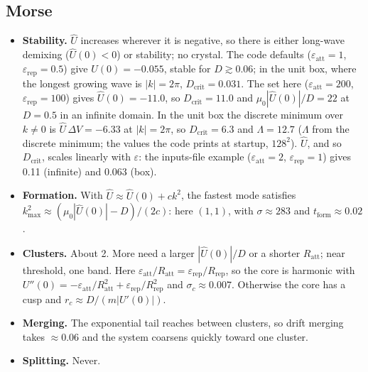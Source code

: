 \documentclass[11pt]{article}
\newcommand{\Uh}{\hat U}
\newcommand{\tf}{t_{\mathrm{form}}}
\begin{document}
\subsection{Morse}
\begin{itemize}
  \item \textbf{Stability.} $\Uh$ increases wherever it is negative, so there
        is either long-wave demixing ($\Uh(0)<0$) or stability; no crystal.
        The code defaults ($\varepsilon_{\mathrm{att}}=1$,
        $\varepsilon_{\mathrm{rep}}=0.5$) give $\Uh(0)=-0.055$, stable for
        $D\gtrsim0.06$; in the unit box, where the longest growing wave is
        $|k|=2\pi$, $D_{\mathrm{crit}}=0.031$. The set here
        ($\varepsilon_{\mathrm{att}}=200$, $\varepsilon_{\mathrm{rep}}=100$)
        gives $\Uh(0)=-11.0$, so $D_{\mathrm{crit}}=11.0$ and $\mu_0|\Uh(0)|/D=22$ at
        $D=0.5$ in an infinite domain. In the unit box the discrete minimum
        over $k\ne0$ is $\Uh\,\Delta V=-6.33$ at $|k|=2\pi$, so
        $D_{\mathrm{crit}}=6.3$ and $\Lambda=12.7$ ($\Lambda$ from the discrete minimum; the values the code prints
        at startup, $128^2$). $\Uh$, and so $D_{\mathrm{crit}}$, scales
        linearly with $\varepsilon$: the inputs-file example
        ($\varepsilon_{\mathrm{att}}=2$, $\varepsilon_{\mathrm{rep}}=1$) gives
        0.11 (infinite) and 0.063 (box).
  \item \textbf{Formation.} With $\Uh\approx\Uh(0)+ck^2$, the fastest mode
        satisfies $k_{\max}^2\approx(\mu_0|\Uh(0)|-D)/(2c)$: here $(1,1)$, with
        $\sigma\approx283$ and $\tf\approx0.02$.
  \item \textbf{Clusters.} About 2. More need a larger $|\Uh(0)|/D$ or a shorter
        $R_{\mathrm{att}}$; near threshold, one band. Here
        $\varepsilon_{\mathrm{att}}/R_{\mathrm{att}}=\varepsilon_{\mathrm{rep}}/R_{\mathrm{rep}}$,
        so the core is harmonic with
        $U''(0)=-\varepsilon_{\mathrm{att}}/R_{\mathrm{att}}^2+\varepsilon_{\mathrm{rep}}/R_{\mathrm{rep}}^2$
        and $\sigma_c\approx0.007$. Otherwise the core has a cusp and
        $r_c\approx D/(m|U'(0)|)$.
  \item \textbf{Merging.} The exponential tail reaches between clusters, so
        drift merging takes $\approx0.06$ and the system coarsens quickly
        toward one cluster.
  \item \textbf{Splitting.} Never.
\end{itemize}
\end{document}
